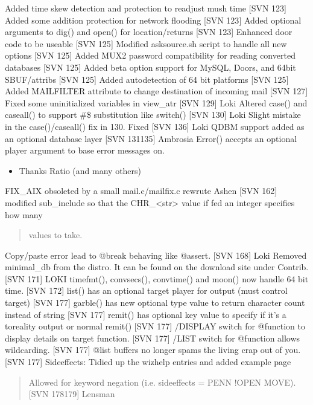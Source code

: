 \documentclass[letterpaper,10pt,english]{sphinxmanual}
\begin{document}
Added time skew detection and protection to readjust mush time {[}SVN 123{]}
Added some addition protection for network flooding {[}SVN 123{]}
Added optional arguments to dig() and open() for location/returns {[}SVN 123{]}
Enhanced door code to be useable {[}SVN 125{]}
Modified asksource.sh script to handle all new options {[}SVN 125{]}
Added MUX2 password compatibility for reading converted databases {[}SVN 125{]}
Added beta option support for MySQL, Doors, and 64bit SBUF/attribs {[}SVN 125{]}
Added auto\sphinxhyphen{}detection of 64 bit platforms {[}SVN 125{]}
Added MAILFILTER attribute to change destination of incoming mail {[}SVN 127{]}
Fixed some uninitialized variables in view\_atr {[}SVN 129{]} \sphinxhyphen{} Loki
Altered case() and caseall() to support \#\$ substitution like switch() {[}SVN 130{]} \sphinxhyphen{} Loki
Slight mistake in the case()/caseall() fix in 130. Fixed {[}SVN 136{]} \sphinxhyphen{} Loki
QDBM support added as an optional database layer {[}SVN 131\sphinxhyphen{}135{]} \sphinxhyphen{} Ambrosia
Error() accepts an optional player argument to base error messages on.
\begin{itemize}
\item {} 
\sphinxAtStartPar
Thanks Ratio (and many others)

\end{itemize}

\sphinxAtStartPar
FIX\_AIX obsoleted by a small mail.c/mailfix.c rewrute \sphinxhyphen{} Ashen {[}SVN 162{]}
modified sub\_include so that the CHR\_\textless{}str\textgreater{} value if fed an integer specifies how many
\begin{quote}

\sphinxAtStartPar
values to take.
\end{quote}

\sphinxAtStartPar
Copy/paste error lead to @break behaving like @assert. {[}SVN 168{]} \sphinxhyphen{} Loki
Removed minimal\_db from the distro. It can be found on the download site under Contrib. {[}SVN 171{]} \sphinxhyphen{} LOKI
timefmt(), convsecs(), convtime() and moon() now handle 64 bit time. {[}SVN 172{]}
list() has an optional target player for output (must control target) {[}SVN 177{]}
garble() has new optional type value to return character count instead of string {[}SVN 177{]}
remit() has optional key value to specify if it’s a to\sphinxhyphen{}reality output or normal remit() {[}SVN 177{]}
/DISPLAY switch for @function to display details on target function. {[}SVN 177{]}
/LIST switch for @function allows wildcarding. {[}SVN 177{]}
@list buffers no longer spams the living crap out of you. {[}SVN 177{]}
Sideeffects: Tidied up the wizhelp entries and added example page
\begin{quote}

\sphinxAtStartPar
Allowed for keyword negation (i.e. sideeffects = PENN !OPEN MOVE). {[}SVN 178\sphinxhyphen{}179{]} \sphinxhyphen{} Lensman
\end{quote}
\end{document}
